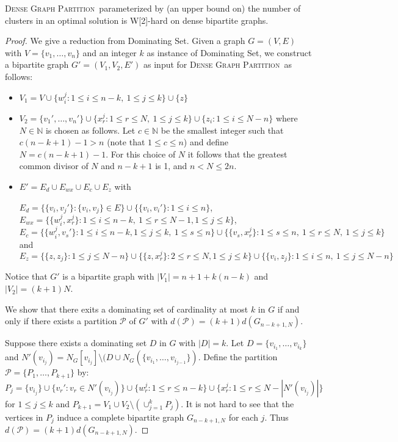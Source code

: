 \documentclass[a4paper,USenglish,cleveref, autoref]{lipics-v2021}
\newcommand\DGP{\textsc{Dense Graph Partition}}
\begin{document}
\begin{theorem} \label{bipartite}
\DGP~parameterized by (an upper bound on) the number of clusters in an optimal solution is  W[2]-hard on dense bipartite graphs. 
\end{theorem}
\begin{proof}

We give a reduction from {\sc Dominating Set}. Given a graph $G=(V,E)$ with $V=\{v_1,\dots,v_n\}$ and an integer $k$ as instance of {\sc Dominating Set}, we construct a bipartite graph $G'=(V_1,V_2,E')$ as input for \DGP~as follows:
\begin{itemize}
\item $V_1= V\cup \{w_i^j\colon 1\leq i\leq n-k, \  1\leq j\leq k\}\cup\{z\}$
\item $V_2=\{v_1',\dots,v_n'\}\cup\{x_r^j\colon 1\leq r\leq N, \ 1\leq j\leq k\}\cup\{z_i\colon 1\leq i\leq N-n\}$ where $N\in \mathbb{N}$ is chosen as follows.
Let $c\in \mathbb N$ be the smallest integer such that  $c(n-k+1)-1 > n$ (note that $1\leq c\leq n$) and define $N=c(n-k+1)-1$. For this choice of $N$ it follows that the greatest common divisor of $N$ and $n-k+1$ is 1, and $n<N\leq 2n$.
\item $E'=E_d\cup E_{wx}\cup E_c  \cup E_z$ with

$E_d=\{\{v_i,v_j'\}\colon \{v_i,v_j\}\in E\}\cup \{\{v_i,v_i'\}\colon 1\leq i\leq n \}$,\\
$E_{wx}=\{\{w_i^j,x_r^j\}\colon 1\leq i\leq n-k, \ 1\leq r\leq N-1, 1\leq j\leq k \}$, \\
$E_c=\{\{w_i^j,v_s'\}\colon 1\leq i\leq n-k, 1\leq j\leq k,\ 1\leq s\leq n\}\cup\{\{v_s,x_r^j\}\colon 1\leq s\leq n, \ 1\leq r\leq N, \ 1\leq j\leq k\}$ and \\ $E_z=\{\{z,z_j\}\colon 1\leq j\leq N-n\} \cup \{\{z,x^j_r\} : 2\leq r\leq N, 1\leq j\leq k \} \cup\{\{v_i,z_j\}\colon 1\leq i\leq n, \  1\leq j\leq N-n \}$
\end{itemize}
Notice that  $G'$ is a bipartite graph with $|V_1|=n+1+ k(n-k)$ and  $|V_2|= (k+1)N$.

We show that there exits a dominating set of cardinality at most $k$ in $G$ if and only if there exists a partition  $\mathcal{P}$ of $G'$ with  $d(\mathcal{P})=(k+1)d(G_{n-k+1,N})$.


Suppose there exists a dominating set $D$ in $G$ with $|D|=k$.
Let $D=\{v_{i_1},\dots,v_{i_k}\}$  and $N'(v_{i_j})=N_G[v_{i_j}]\setminus (D\cup N_G(\{v_{i_1},\dots, v_{i_{j-1}}\})$. Define the partition $\mathcal{P}=\{P_1,\dots,P_{k+1}\}$ by:\\ $P_j=\{v_{i_j}\}\cup \{v_r'\colon v_r \in N'(v_{i_j})\} \cup \{w_r^j\colon 1\leq r \leq n-k\} \cup\{x_r^j\colon 1\leq r\leq N-|N'(v_{i_j})| \}$ for $1\leq j\leq k $ and $P_{k+1}=V_1\cup V_2\setminus (\cup_{j=1}^k P_j)$.
It is not hard to see that the vertices in $P_j$ induce a complete bipartite graph $G_{n-k+1,N}$ for each $j$. Thus $d(\mathcal{P})=(k+1)d(G_{n-k+1,N})$.




\end{proof}
\end{document}
